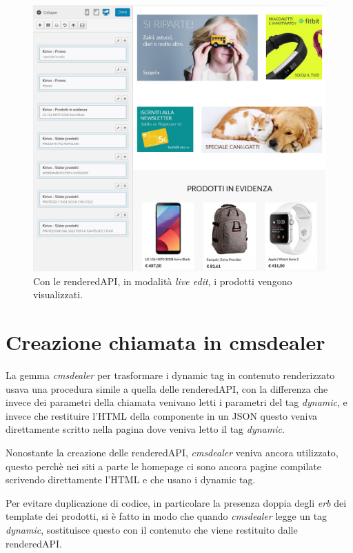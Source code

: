 \begin{figure}
  \includegraphics[width=\textwidth]{figure/livedit.png}
  \caption{Con le renderedAPI, in modalità \emph{live edit}, i prodotti vengono visualizzati.}
  \label{fig:kspec}
\end{figure}

\newpage
\section{Creazione chiamata in cmsdealer}

La gemma \emph{cmsdealer} per trasformare i dynamic tag in contenuto renderizzato usava una procedura simile 
a quella delle renderedAPI, con la differenza che invece dei parametri della chiamata venivano letti i parametri
del tag \emph{dynamic}, e invece che restituire l'HTML della componente in un JSON questo veniva direttamente
scritto nella pagina dove veniva letto il tag \emph{dynamic}.

Nonostante la creazione delle renderedAPI, \emph{cmsdealer} veniva ancora utilizzato,
questo perchè nei siti a parte le homepage ci sono ancora pagine compilate scrivendo direttamente l'HTML
e che usano i dynamic tag.

Per evitare duplicazione di codice, in particolare la presenza doppia degli \emph{erb} dei template dei prodotti,
si è fatto in modo che quando \emph{cmsdealer} legge un tag \emph{dynamic}, sostituisce questo con il contenuto
che viene restituito dalle renderedAPI.

